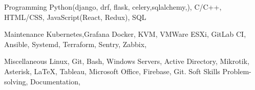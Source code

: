 

\begin{cvskills}

  \cvskill
    {Programming}
    {Python(django, drf, flask, celery,sqlalchemy,), C/C++, HTML/CSS, JavaScript(React, Redux), SQL} %

  \cvskill
    {Maintenance}
    {Kubernetes,Grafana Docker, KVM, VMWare ESXi, GitLab CI, Ansible, Systemd, Terraform, Sentry, Zabbix, } %

  \cvskill
    {Miscellaneous} %
    {Linux, Git, Bash, Windows Servers, Active Directory, Mikrotik, Asterisk, \LaTeX, Tableau, Microsoft Office, Firebase, Git.} %
  \cvskill
    {Soft Skills} %
    {Problem-solving, Documentation, } %

\end{cvskills}
